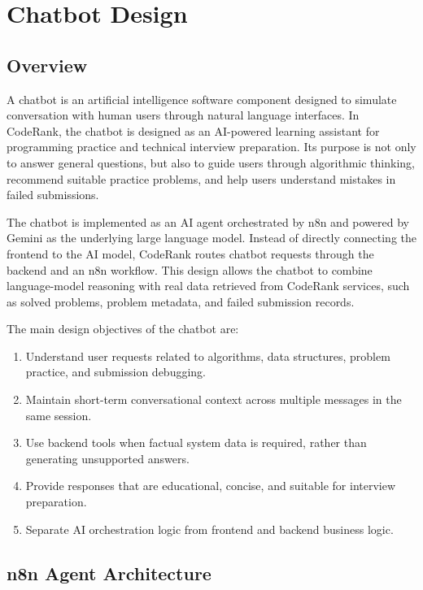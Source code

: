 \section{Chatbot Design}

\subsection{Overview}

A chatbot is an artificial intelligence software component designed to simulate conversation with human users through natural language interfaces.\cite{chatbot_definition} In CodeRank, the chatbot is designed as an AI-powered learning assistant for programming practice and technical interview preparation. Its purpose is not only to answer general questions, but also to guide users through algorithmic thinking, recommend suitable practice problems, and help users understand mistakes in failed submissions.

The chatbot is implemented as an AI agent orchestrated by n8n and powered by Gemini as the underlying large language model. Instead of directly connecting the frontend to the AI model, CodeRank routes chatbot requests through the backend and an n8n workflow. This design allows the chatbot to combine language-model reasoning with real data retrieved from CodeRank services, such as solved problems, problem metadata, and failed submission records.

The main design objectives of the chatbot are:
\begin{enumerate}
    \item Understand user requests related to algorithms, data structures, problem practice, and submission debugging.
    \item Maintain short-term conversational context across multiple messages in the same session.
    \item Use backend tools when factual system data is required, rather than generating unsupported answers.
    \item Provide responses that are educational, concise, and suitable for interview preparation.
    \item Separate AI orchestration logic from frontend and backend business logic.
\end{enumerate}

\subsection{n8n Agent Architecture}

